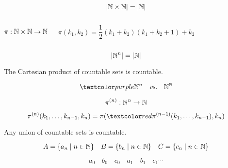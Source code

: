 \begin{frame}{}
  \begin{theorem}
    \[
      |\mathbb{N} \times \mathbb{N}| = |\mathbb{N}|
    \]
  \end{theorem}

  \begin{columns}
      \pause
      \[
	\pi: \mathbb{N} \times \mathbb{N} \to \mathbb{N} 
      \]

      \pause
      \[
	\pi(k_1, k_2) = \frac{1}{2} (k_1 + k_2)(k_1 + k_2 + 1) + k_2
      \]
  \end{columns}

  \pause
  \begin{center}
  \end{center}
\end{frame}

\begin{frame}{}
  \begin{theorem}[$\N^{n}$ is Countable.]
    \[
      |\mathbb{N}^{n}| = |\mathbb{N}|
    \]
  \end{theorem}

  \pause
  \begin{theorem}
    The Cartesian product of  countable sets is countable.
  \end{theorem}

  \pause
  \[
    \purple{\N^{n} \quad \text{\it vs.} \quad \N^{\N}}
  \]

  \pause
  \[
    \pi^{(n)}:\mathbb{N}^n \to \mathbb{N}
  \]
  
  \pause
  \[
    \pi^{(n)}(k_1, \ldots, k_{n-1}, k_n) = \pi (\red{\pi^{(n-1)}}(k_1, \ldots, k_{n-1}) , k_n)
  \]
\end{frame}

\begin{frame}{}
  \begin{theorem}
    Any  union of countable sets is countable.
  \end{theorem}

  \pause
  \[
    A = \{a_n \mid n \in \mathbb{N}\} \quad B = \{b_n \mid n \in \mathbb{N}\} \quad C = \{c_n \mid n \in \mathbb{N}\}
  \]

  \pause
  \[
    a_0 \quad b_0 \quad c_0 \quad a_1 \quad b_1 \quad c_1 \cdots
  \]
\end{frame}

